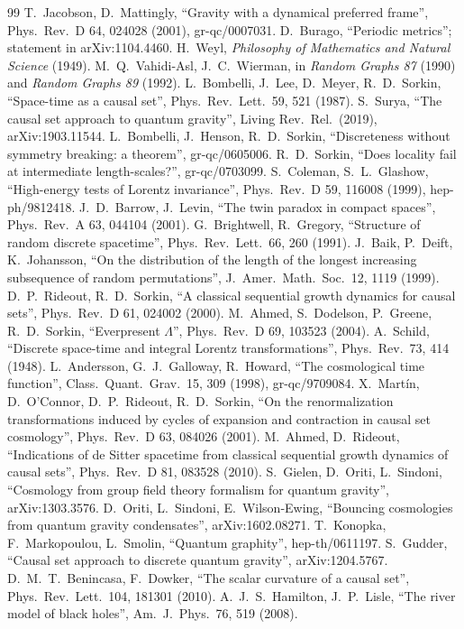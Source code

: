 \documentclass[11pt,a4paper]{article}
\begin{document}
\begin{thebibliography}{99}\small
{} T.~Jacobson, D.~Mattingly, ``Gravity with a dynamical preferred frame'', Phys.\ Rev.\ D 64, 024028 (2001), gr-qc/0007031.
 D.~Burago, ``Periodic metrics''; statement in arXiv:1104.4460.
 H.~Weyl, \emph{Philosophy of Mathematics and Natural Science} (1949).
 M.~Q.~Vahidi-Asl, J.~C.~Wierman, in \emph{Random Graphs 87} (1990) and \emph{Random Graphs 89} (1992).
 L.~Bombelli, J.~Lee, D.~Meyer, R.~D.~Sorkin, ``Space-time as a causal set'', Phys.\ Rev.\ Lett.\ 59, 521 (1987).
 S.~Surya, ``The causal set approach to quantum gravity'', Living Rev.\ Rel.\ (2019), arXiv:1903.11544.
 L.~Bombelli, J.~Henson, R.~D.~Sorkin, ``Discreteness without symmetry breaking: a theorem'', gr-qc/0605006.
 R.~D.~Sorkin, ``Does locality fail at intermediate length-scales?'', gr-qc/0703099.
 S.~Coleman, S.~L.~Glashow, ``High-energy tests of Lorentz invariance'', Phys.\ Rev.\ D 59, 116008 (1999), hep-ph/9812418.
 J.~D.~Barrow, J.~Levin, ``The twin paradox in compact spaces'', Phys.\ Rev.\ A 63, 044104 (2001).
 G.~Brightwell, R.~Gregory, ``Structure of random discrete spacetime'', Phys.\ Rev.\ Lett.\ 66, 260 (1991).
 J.~Baik, P.~Deift, K.~Johansson, ``On the distribution of the length of the longest increasing subsequence of random permutations'', J.\ Amer.\ Math.\ Soc.\ 12, 1119 (1999).
 D.~P.~Rideout, R.~D.~Sorkin, ``A classical sequential growth dynamics for causal sets'', Phys.\ Rev.\ D 61, 024002 (2000).
 M.~Ahmed, S.~Dodelson, P.~Greene, R.~D.~Sorkin, ``Everpresent $\Lambda$'', Phys.\ Rev.\ D 69, 103523 (2004).
 A.~Schild, ``Discrete space-time and integral Lorentz transformations'', Phys.\ Rev.\ 73, 414 (1948).
 L.~Andersson, G.~J.~Galloway, R.~Howard, ``The cosmological time function'', Class.\ Quant.\ Grav.\ 15, 309 (1998), gr-qc/9709084.
 X.~Mart\'in, D.~O'Connor, D.~P.~Rideout, R.~D.~Sorkin, ``On the renormalization transformations induced by cycles of expansion and contraction in causal set cosmology'', Phys.\ Rev.\ D 63, 084026 (2001).
 M.~Ahmed, D.~Rideout, ``Indications of de Sitter spacetime from classical sequential growth dynamics of causal sets'', Phys.\ Rev.\ D 81, 083528 (2010).
 S.~Gielen, D.~Oriti, L.~Sindoni, ``Cosmology from group field theory formalism for quantum gravity'', arXiv:1303.3576.
 D.~Oriti, L.~Sindoni, E.~Wilson-Ewing, ``Bouncing cosmologies from quantum gravity condensates'', arXiv:1602.08271.
 T.~Konopka, F.~Markopoulou, L.~Smolin, ``Quantum graphity'', hep-th/0611197.
 S.~Gudder, ``Causal set approach to discrete quantum gravity'', arXiv:1204.5767.
 D.~M.~T.~Benincasa, F.~Dowker, ``The scalar curvature of a causal set'', Phys.\ Rev.\ Lett.\ 104, 181301 (2010).
 A.~J.~S.~Hamilton, J.~P.~Lisle, ``The river model of black holes'', Am.\ J.\ Phys.\ 76, 519 (2008).
\end{thebibliography}
\end{document}
